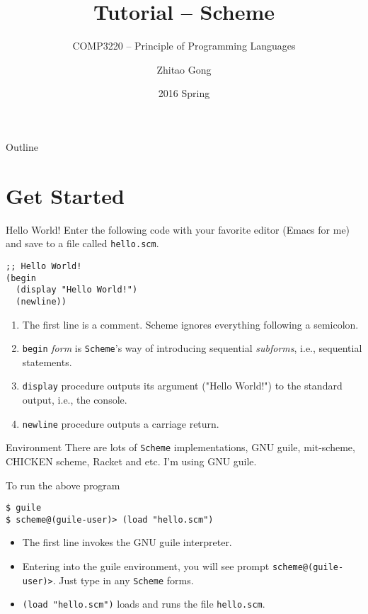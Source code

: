 \documentclass[presentation]{beamer}
\author{Zhitao Gong}
\date{2016 Spring}
\title{Tutorial -- Scheme}
\subtitle{COMP3220 -- Principle of Programming Languages}
\begin{document}
\maketitle
\begin{frame}{Outline}
\setcounter{tocdepth}{2}
\tableofcontents
\end{frame}


\section{Get Started}
\label{sec:orgheadline6}

\begin{frame}[fragile,label={sec:orgheadline1}]{Hello World!}
 Enter the following code with your favorite editor (Emacs for me)
and save to a file called \texttt{hello.scm}.

\begin{verbatim}
;; Hello World!
(begin
  (display "Hello World!")
  (newline))
\end{verbatim}

\begin{enumerate}
\item The first line is a comment.  Scheme ignores everything
following a semicolon.
\item \texttt{begin} \emph{form} is \texttt{Scheme}'s way of introducing sequential
\emph{subforms}, i.e., sequential statements.
\item \texttt{display} procedure outputs its argument ("Hello World!") to the
standard output, i.e., the console.
\item \texttt{newline} procedure outputs a carriage return.
\end{enumerate}
\end{frame}

\begin{frame}[fragile,label={sec:orgheadline2}]{Environment}
 There are lots of \texttt{Scheme} implementations, GNU guile, mit-scheme,
CHICKEN scheme, Racket and etc.  I'm using GNU guile.

To run the above program

\begin{verbatim}
$ guile
$ scheme@(guile-user)> (load "hello.scm")
\end{verbatim}

\begin{itemize}
\item The first line invokes the GNU guile interpreter.
\item Entering into the guile environment, you will see prompt
\texttt{scheme@(guile-user)>}.  Just type in any \texttt{Scheme} forms.
\item \texttt{(load "hello.scm")} loads and runs the file \texttt{hello.scm}.
\end{itemize}
\end{frame}
\end{document}
